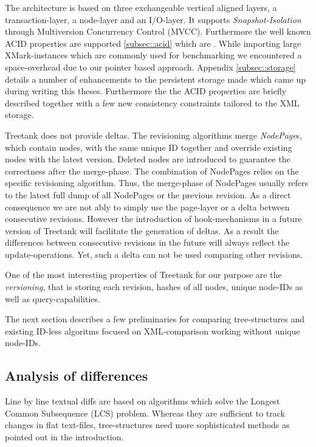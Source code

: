 The architecture is based on three exchangeable vertical aligned layers, a transaction-layer, a node-layer and an I/O-layer. It supports \emph{Snapshot-Isolation} through Multiversion Concurrency Control (MVCC). Furthermore the well known ACID properties are supported \ref{subsec::acid} which are . While importing large XMark-instances \cite{XMark} which are commonly used for benchmarking we encountered a space-overhead due to our pointer based approach. Appendix \ref{subsec::storage} details a number of enhancements to the persistent storage made which came up during writing this theses. Furthermore the  the ACID properties are briefly described together with a few new consistency constraints tailored to the XML storage.

Treetank does not provide deltas. The revisioning algorithms merge \emph{NodePage}s, which contain nodes, with the same unique ID together and override existing nodes with the latest version. Deleted nodes are introduced to guarantee the correctness after the merge-phase. The combination of NodePages relies on the specific revisioning algorithm. Thus, the merge-phase of NodePages usually refers to the latest full dump of all NodePages or the previous revision. As a direct consequence we are not ably to simply use the page-layer or a delta between consecutive revisions. However the introduction of hook-mechanisms in a future version of Treetank will facilitate the generation of deltas. As a result the differences between consecutive revisions in the future will always reflect the update-operations. Yet, such a delta can not be used comparing other revisions.

One of the most interesting properties of Treetank for our purpose are the \emph{versioning}, that is storing each revision, hashes of all nodes, unique node-IDs as well as query-capabilities.

The next section describes a few preliminaries for comparing tree-structures and existing ID-less algoritms focused on XML-comparison working without unique node-IDs.

\subsection{Analysis of differences}
Line by line textual diffs are based on algorithms which solve the Longest Common Subsequence (LCS) problem. Whereas they are sufficient to track changes in flat text-files, tree-structures need more sophisticated methods as pointed out in the introduction.

